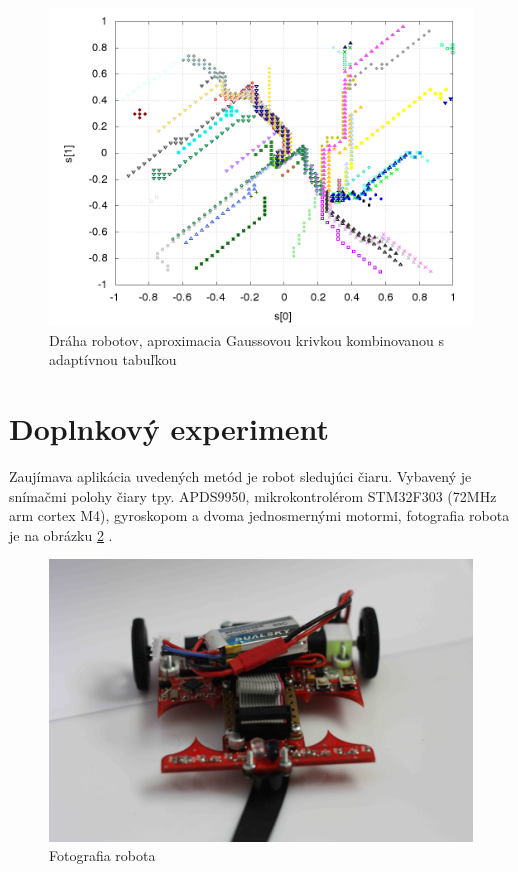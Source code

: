   \begin{figure}[!htb]
  \centering
  \includegraphics[scale=.4]{../../results_q_learning/map_2/function_type_6/iterations_10/agents_path_surface.png}
  \caption{Dráha robotov, aproximacia  Gaussovou krivkou kombinovanou s adaptívnou tabuľkou}
  \label{img:experiment_gauss_adaptive_table_path}
  \end{figure}



\newpage
\section {Doplnkový experiment}

Zaujímava aplikácia uvedených metód je robot sledujúci čiaru. Vybavený je snímačmi
polohy čiary tpy. APDS9950, mikrokontrolérom STM32F303 (72MHz arm cortex M4),
gyroskopom a dvoma jednosmernými motormi, fotografia robota je na obrázku \ref{img:motoko_photo}
.

\begin{figure}[!htb]
\center
\includegraphics[scale=.08]{../pictures/motoko_aftermath_front.jpg}
\caption{Fotografia robota}
\label{img:motoko_photo}
\end{figure}

